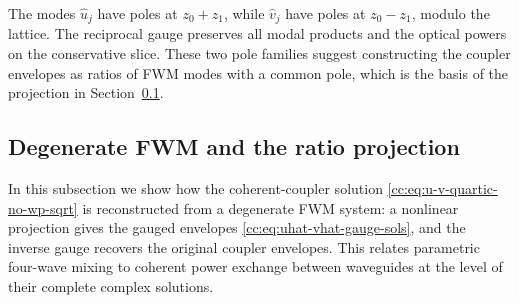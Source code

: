 \documentclass{optica-article}
\numberwithin{equation}{section}
\begin{document}
The modes $\hat u_j$ have poles at $z_0+z_1$, while $\hat v_j$ have poles at $z_0-z_1$, modulo the lattice.
The reciprocal gauge preserves all modal products and the optical powers on the conservative slice.
These two pole families suggest constructing the coupler envelopes as ratios of FWM modes with a common pole, which is the basis of the projection in Section~\ref{cc:subsec:deg-fwm}.

\subsection{Degenerate FWM and the ratio projection}\label{cc:subsec:deg-fwm}
In this subsection we show how the coherent-coupler solution \eqref{cc:eq:u-v-quartic-no-wp-sqrt} is reconstructed from a degenerate FWM system: a nonlinear projection gives the gauged envelopes \eqref{cc:eq:uhat-vhat-gauge-sols}, and the inverse gauge recovers the original coupler envelopes.
This relates parametric four-wave mixing to coherent power exchange between waveguides at the level of their complete complex solutions.
\end{document}
